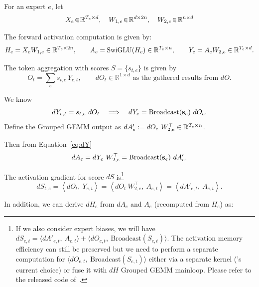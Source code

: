 
\label{sec:appendix:proof}
For an expert $e$, let
\begin{equation}
    X_{e}\!\in\!\mathbb{R}^{T_e\times d},\quad
    W_{1,e}\!\in\!\mathbb{R}^{d\times 2n},\quad
    W_{2,e}\!\in\!\mathbb{R}^{n\times d}
\end{equation}

The forward activation computation is given by:
\begin{equation}
    H_e = X_{e} W_{1,e}\in\mathbb{R}^{T_e\times 2n},\qquad
    A_{e}=\mathrm{SwiGLU}(H_e)\in\mathbb{R}^{T_e\times n},\qquad
    Y_{e}=A_{e}W_{2,e}\in\mathbb{R}^{T_e\times d}.
\end{equation}

The token aggregation with scores $S=\{s_{t,e}\}$ is given by
\begin{equation}
    O_t=\sum_{e} s_{t,e}\,Y_{e,t},\qquad dO_t \in \mathbb{R}^{1\times d} \text{ as the gathered results from } dO.
\end{equation}

We know
\begin{align}
    d Y_{e,t} = s_{t,e}\ dO_t
    \quad\Longrightarrow\quad
    dY_{e} = \mathrm{Broadcast}({\mathbf{s}}_e)\ dO_{e}. \label{eq:dY}
\end{align}
Define the Grouped GEMM output as $dA'_{e} := dO_{e}\ W_{2,e}^{\top}\in\mathbb{R}^{T_e\times n}$.

Then from Equation~\ref{eq:dY}
\begin{equation}
    dA_{e} = dY_{e}\ W_{2,e}^{\top} = \mathrm{Broadcast}(\vs_e)\ dA'_{e}.
\end{equation}


The activation gradient for score $dS$ is\footnote{If we also consider expert biases, we will have  $dS_{e,t} = \langle dA'_{e,t},\ A_{e,t}\rangle + \langle dO_{e,t},\ \mathrm{Broadcast}(S_{e,t})\rangle$. The activation memory efficiency can still be preserved but we need to perform a separate computation for $\langle dO_{e,t},\ \mathrm{Broadcast}(S_{e,t})\rangle$ either via a separate kernel (\Algname's current choice) or fuse it with $dH$ Grouped GEMM mainloop. Please refer to the released code of~\Algname. }
\begin{equation}
\label{eq:ds-n-reduce}
    \boxed{dS_{t,e}=\left\langle dO_t,\ Y_{e,t}\right\rangle
      =\left\langle dO_t\ W_{2,e}^{\top},\ A_{e,t}\right\rangle
      =\left\langle dA'_{e,t},\ A_{e,t}\right\rangle }.
\end{equation}

In addition, we can derive $dH_e$ from $dA_e$ and $A_e$ (recomputed from $H_e$) as:


